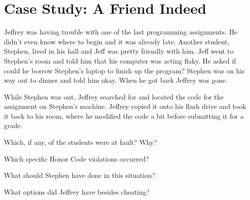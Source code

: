 \section*{Case Study: A Friend Indeed}

Jeffrey was having trouble with one of the last programming assignments.
He didn't even know where to begin and it was already late.
Another student, Stephen, lived in his hall and Jeff was pretty friendly with him.
Jeff went to Stephen's room and told him that his computer was acting flaky.
He asked if could he borrow Stephen's laptop to finish up the program?
Stephen was on his way out to dinner and told him okay.
When he got back Jeffrey was gone.

\vspace{1em}

While Stephen was out, Jeffrey searched for and located the code for the assignment on Stephen's machine.
Jeffrey copied it onto his flash drive and took it back to his room, where he modified the code a bit before submitting it for a grade.




\Q Which, if any, of the students were at fault? Why?

\begin{answer}[6em]
\end{answer}


\Q Which specific Honor Code violations occurred?

\begin{answer}[6em]
\end{answer}


\Q What should Stephen have done in this situation?

\begin{answer}[6em]
\end{answer}


\Q What options did Jeffrey have besides cheating?

\begin{answer}[6em]
\end{answer}
